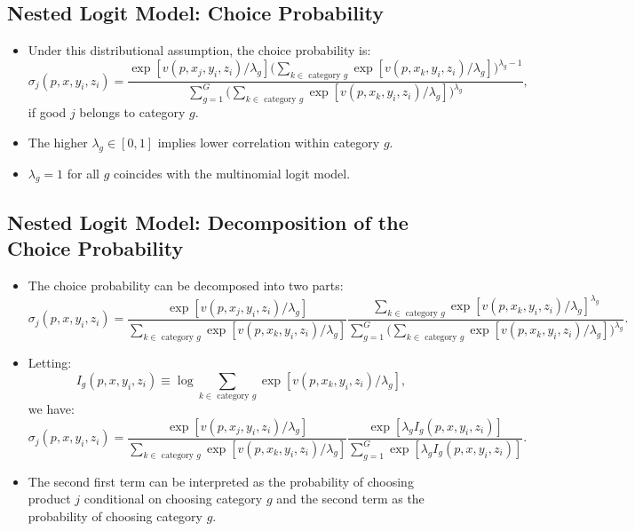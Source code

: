 \documentclass[
]{book}
\providecommand{\tightlist}{%
  \setlength{\itemsep}{0pt}\setlength{\parskip}{0pt}}
\begin{document}
\hypertarget{nested-logit-model-choice-probability}{%
\subsection{Nested Logit Model: Choice Probability}\label{nested-logit-model-choice-probability}}

\begin{itemize}
\tightlist
\item
  Under this distributional assumption, the choice probability is:
  \begin{equation}
  \sigma_{j}(p, x, y_i, z_i) = \frac{\exp[v(p, x_j, y_i, z_i)/\lambda_g] \Bigg(\sum_{k \in \text{   category   } g} \exp[v(p, x_k, y_i, z_i)/\lambda_g]\Bigg)^{\lambda_g - 1}}{\sum_{g = 1}^G \Bigg(\sum_{k \in \text{   category   } g} \exp[v(p, x_k, y_i, z_i)/\lambda_g]\Bigg)^{\lambda_g}},
  \end{equation}
  if good \(j\) belongs to category \(g\).
\item
  The higher \(\lambda_g \in [0, 1]\) implies lower correlation within category \(g\).
\item
  \(\lambda_g = 1\) for all \(g\) coincides with the multinomial logit model.
\end{itemize}

\hypertarget{nested-logit-model-decomposition-of-the-choice-probability}{%
\subsection{Nested Logit Model: Decomposition of the Choice Probability}\label{nested-logit-model-decomposition-of-the-choice-probability}}

\begin{itemize}
\tightlist
\item
  The choice probability can be decomposed into two parts:
  \begin{equation}
  \sigma_{j}(p, x, y_i, z_i) = \frac{\exp[v(p, x_j, y_i, z_i)/\lambda_g]}{\sum_{k \in \text{   category   } g} \exp[v(p, x_k, y_i, z_i)/\lambda_g]} \frac{\sum_{k \in \text{   category   } g} \exp[v(p, x_k, y_i, z_i)/\lambda_g]^{\lambda_g}}{\sum_{g = 1}^G \Bigg(\sum_{k \in \text{   category   } g} \exp[v(p, x_k, y_i, z_i)/\lambda_g]\Bigg)^{\lambda_g}}.
  \end{equation}
\item
  Letting:
  \[
  I_{g}(p, x, y_i, z_i) \equiv \log \sum_{k \in \text{   category   } g} \exp[v(p, x_k, y_i, z_i)/\lambda_g],
  \]
  we have:
  \begin{equation}
  \sigma_{j}(p, x, y_i, z_i) = \frac{\exp[v(p, x_j, y_i, z_i)/\lambda_g]}{\sum_{k \in \text{   category   } g} \exp[v(p, x_k, y_i, z_i)/\lambda_g]} \frac{\exp[\lambda_g I_{g}(p, x, y_i, z_i)]}{\sum_{g = 1}^G \exp[\lambda_g I_{g}(p, x, y_i, z_i)]}.
  \end{equation}
\item
  The second first term can be interpreted as the probability of choosing product \(j\) conditional on choosing category \(g\) and the second term as the probability of choosing category \(g\).
\end{itemize}
\end{document}
